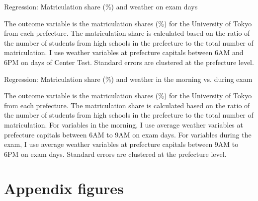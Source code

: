 \documentclass[12pt,letterpaper]{article}
\begin{document}
\begin{table}[H]
  \center
  \caption{Regression: Matriculation share (\%) and weather on exam days}
  
  \label{tab:main_reg}
  \small
  \begin{tablenotes}
    \item
      The outcome variable is the matriculation shares (\%) for the University of Tokyo from each prefecture.
      The matriculation share is calculated based on the ratio of the number of students from high schools in the prefecture to the total number of matriculation.
      I use weather variables at prefecture capitals between 6AM and 6PM on days of Center Test.
      Standard errors are clustered at the prefecture level.
  \end{tablenotes}
\end{table}

\begin{table}[H]
  \center
  \caption{Regression: Matriculation share (\%) and weather in the morning vs. during exam}
  \scriptsize
  
  \label{tab:reg_morning_exam}
  \scriptsize
  \begin{tablenotes}
    \item
      The outcome variable is the matriculation shares (\%) for the University of Tokyo from each prefecture.
      The matriculation share is calculated based on the ratio of the number of students from high schools in the prefecture to the total number of matriculation.
      For variables in the morning, I use average weather variables at prefecture capitals between 6AM to 9AM on exam days.
      For variables during the exam, I use average weather variables at prefecture capitals between 9AM to 6PM on exam days.
      Standard errors are clustered at the prefecture level.
  \end{tablenotes}
\end{table}


\appendix

\setcounter{figure}{0}
\setcounter{table}{0}
\renewcommand\thefigure{\Alph{section}.\arabic{figure}}
\renewcommand\thetable{\Alph{section}.\arabic{table}}
  
\section{Appendix figures}\label{sec:appendix_figure}
\end{document}
